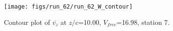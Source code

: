 \begin{figure}[H]
\centering
\texttt{[image: figs/run\_62/run\_62\_W\_contour]}
\caption{Contour plot of $\overline{v_{z}}$ at $z/c$=10.00, $V_{free}$=16.98, station 7.}
\label{fig:run_62_W_contour}
\end{figure}


